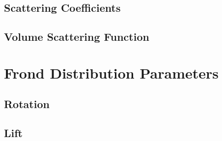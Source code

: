 \subsection{Scattering Coefficients}
\subsection{Volume Scattering Function}

\section{Frond Distribution Parameters}
\subsection{Rotation}
\subsection{Lift}
